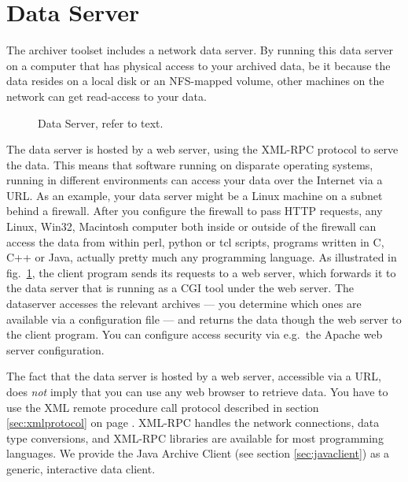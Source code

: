 \section{Data Server} \label{sec:dataserver}
The archiver toolset includes a network data server.
By running this data server on a computer that has
physical access to your archived data, be it because the data resides
on a local disk or an NFS-mapped volume, other machines
on the network can get read-access to your data.

\begin{figure}[htb]
\begin{center}
\end{center}
\caption{\label{fig:dataserver}Data Server, refer to text.}
\end{figure}

\noindent The data server is hosted by a web server, using the XML-RPC
protocol to serve the data. This means that software running on
disparate operating systems, running in different environments can
access your data over the Internet via a URL. As an example, your data
server might be a Linux machine on a subnet behind a firewall. After
you configure the firewall to pass HTTP requests, any Linux, Win32,
Macintosh computer both inside or outside of the firewall can access
the data from within perl, python or tcl scripts, programs written in
C, C++ or Java, actually pretty much any programming language. As
illustrated in fig.~\ref{fig:dataserver}, the client program sends its
requests to a web server, which forwards it to the data server that is
running as a CGI tool under the web server. The dataserver accesses
the relevant archives --- you determine which ones are available via a
configuration file --- and returns the data though the web server to
the client program.  You can configure access security via e.g.\ the
Apache web server configuration.

\NOTE The fact that the data server is hosted by a web server,
accessible via a URL, does \emph{not} imply that you can use any web browser
to retrieve data. You have to use the XML remote procedure call
protocol described in section \ref{sec:xmlprotocol} on page
\pageref{sec:xmlprotocol}. XML-RPC handles the network connections,
data type conversions, and XML-RPC libraries are available for most
programming languages.
We provide the Java Archive Client (see section \ref{sec:javaclient})
as a generic, interactive data client. 

